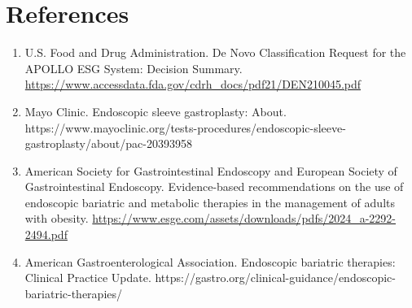 \section*{References}
\begin{enumerate}
  \item U.S. Food and Drug Administration. De Novo Classification Request for the APOLLO ESG System: Decision Summary. \url{https://www.accessdata.fda.gov/cdrh_docs/pdf21/DEN210045.pdf}
  \item Mayo Clinic. Endoscopic sleeve gastroplasty: About. https://www.mayoclinic.org/tests-procedures/endoscopic-sleeve-gastroplasty/about/pac-20393958
  \item American Society for Gastrointestinal Endoscopy and European Society of Gastrointestinal Endoscopy. Evidence-based recommendations on the use of endoscopic bariatric and metabolic therapies in the management of adults with obesity. \url{https://www.esge.com/assets/downloads/pdfs/2024_a-2292-2494.pdf}
  \item American Gastroenterological Association. Endoscopic bariatric therapies: Clinical Practice Update. https://gastro.org/clinical-guidance/endoscopic-bariatric-therapies/
\end{enumerate}

\clearpage
